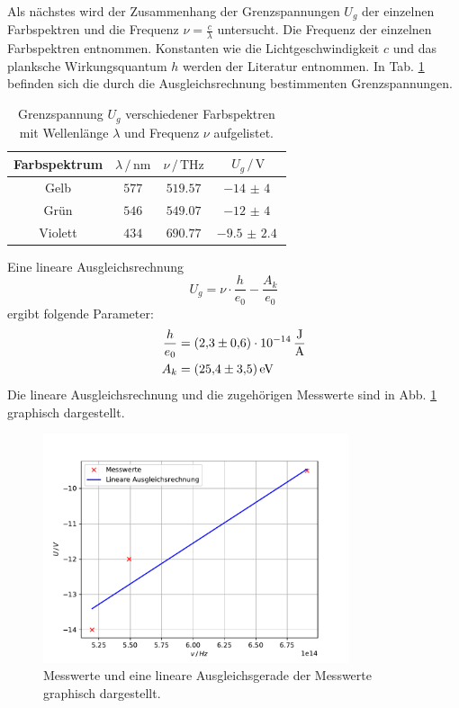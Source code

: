Als nächstes wird der Zusammenhang der Grenzspannungen $U_g$ der einzelnen Farbspektren und die Frequenz $\nu = \frac{c}{\lambda}$ untersucht.
Die Frequenz der einzelnen Farbspektren \cite[9]{anleitung} entnommen.
Konstanten wie die Lichtgeschwindigkeit $c$ und das planksche Wirkungsquantum $h$ werden der Literatur \cite{konstanten} entnommen.
In Tab. \ref{tab:grenzspannung} befinden sich die durch die Ausgleichsrechnung bestimmenten Grenzspannungen.
\begin{table}
  \centering
  \begin{tabular}{c|ccc}
    \toprule
    Farbspektrum & $\lambda \,/\, \si{\nano\metre}$ & $\nu \,/\, \si{\tera\hertz}$ & $U_g \,/\, \si{\volt}$ \\
    \midrule
    Gelb & $577$ & $519.57$ & $\SI{-14(4)}{}$ \\
    Grün & $546$ & $549.07$ & $\SI{-12(4)}{}$ \\
    Violett & $434$ & $690.77$ & $\SI{-9.5(24)}{}$ \\
    \bottomrule
  \end{tabular}
  \caption{Grenzspannung $U_g$ verschiedener Farbspektren mit Wellenlänge $\lambda$ und Frequenz $\nu$ aufgelistet.}
  \label{tab:grenzspannung}
\end{table}
Eine lineare Ausgleichsrechnung
\begin{equation*}
  U_g = \nu \cdot \frac{h}{e_0} - \frac{A_k}{e_0}
\end{equation*}
ergibt folgende Parameter:
\begin{align*}
  \frac{h}{e_0} &= \SI{2.3(6)e-14}{\frac{\joule}{\ampere}} \\
  A_k &= \SI{25.4(35)}{\electronvolt}
\end{align*}
Die lineare Ausgleichsrechnung und die zugehörigen Messwerte sind in Abb. \ref{fig:grenzspannung} graphisch dargestellt.
\begin{figure}
  \centering
  \includegraphics[width=0.8\textwidth]{content/data/grenzspannung_ausgleich.pdf}
  \caption{Messwerte und eine lineare Ausgleichsgerade der Messwerte graphisch dargestellt. \cite{matplotlib}\cite{scipy}\cite{numpy}\cite{uncertainties}}
  \label{fig:grenzspannung}
\end{figure}
